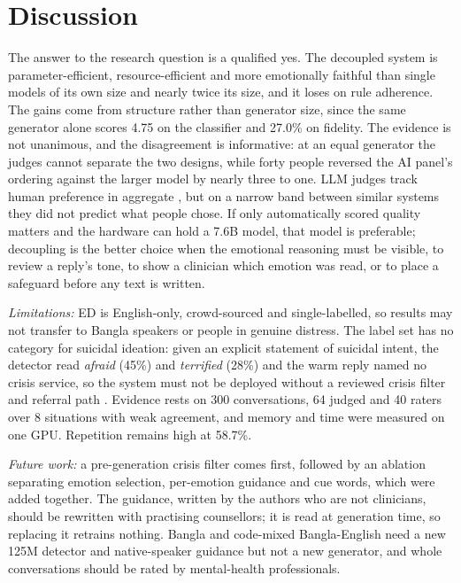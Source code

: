 \section{Discussion}\label{sec:discussion}
The answer to the research question is a qualified yes. The decoupled system is parameter-efficient, resource-efficient and more emotionally faithful than single models of its own size and nearly twice its size, and it loses on rule adherence. The gains come from structure rather than generator size, since the same generator alone scores 4.75 on the classifier and 27.0\% on fidelity. The evidence is not unanimous, and the disagreement is informative: at an equal generator the judges cannot separate the two designs, while forty people reversed the AI panel's ordering against the larger model by nearly three to one. LLM judges track human preference in aggregate \cite{zheng2023judge}, but on a narrow band between similar systems they did not predict what people chose. If only automatically scored quality matters and the hardware can hold a 7.6B model, that model is preferable; decoupling is the better choice when the emotional reasoning must be visible, to review a reply's tone, to show a clinician which emotion was read, or to place a safeguard before any text is written.

\textit{Limitations:} ED is English-only, crowd-sourced and single-labelled, so results may not transfer to Bangla speakers or people in genuine distress. The label set has no category for suicidal ideation: given an explicit statement of suicidal intent, the detector read \textit{afraid} (45\%) and \textit{terrified} (28\%) and the warm reply named no crisis service, so the system must not be deployed without a reviewed crisis filter and referral path \cite{who2023suicide}. Evidence rests on 300 conversations, 64 judged and 40 raters over 8 situations with weak agreement, and memory and time were measured on one GPU. Repetition remains high at 58.7\%.

\textit{Future work:} a pre-generation crisis filter comes first, followed by an ablation separating emotion selection, per-emotion guidance and cue words, which were added together. The guidance, written by the authors who are not clinicians, should be rewritten with practising counsellors; it is read at generation time, so replacing it retrains nothing. Bangla and code-mixed Bangla-English need a new 125M detector and native-speaker guidance but not a new generator, and whole conversations should be rated by mental-health professionals.

